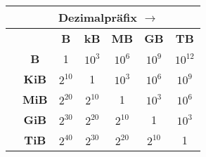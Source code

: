 \documentclass[12pt]{standalone}
\begin{document}
\begin{tabular}{|c|c|c|c|c|c|c|}
	\hline\rule{0pt}{3ex}
	\space                                                                       & \multicolumn{6}{c|}{Dezimalpräfix $\longrightarrow$}                                                                      \\
	\hline\rule{0pt}{3ex}
	\multirow{6}{*}{\rotatebox[origin=center]{90}{$\longleftarrow$ Binärpräfix}} & \space                                               & \textbf{B} & \textbf{kB} & \textbf{MB} & \textbf{GB} & \textbf{TB} \\
	\cline{2-7}\rule{0pt}{3ex}                                                   & \textbf{B}                                           & 1          & $10^{3}$    & $10^{6}$    & $10^{9}$    & $10^{12}$   \\
	\cline{2-7}\rule{0pt}{3ex}                                                   & \textbf{KiB}                                         & $2^{10}$   & 1           & $10^{3}$    & $10^{6}$    & $10^{9}$    \\
	\cline{2-7}\rule{0pt}{3ex}                                                   & \textbf{MiB}                                         & $2^{20}$   & $2^{10}$    & 1           & $10^{3}$    & $10^{6}$    \\
	\cline{2-7}\rule{0pt}{3ex}                                                   & \textbf{GiB}                                         & $2^{30}$   & $2^{20}$    & $2^{10}$    & 1           & $10^{3}$    \\
	\cline{2-7}\rule{0pt}{3ex}                                                   & \textbf{TiB}                                         & $2^{40}$   & $2^{30}$    & $2^{20}$    & $2^{10}$    & 1           \\
	\hline
\end{tabular}
\end{document}
